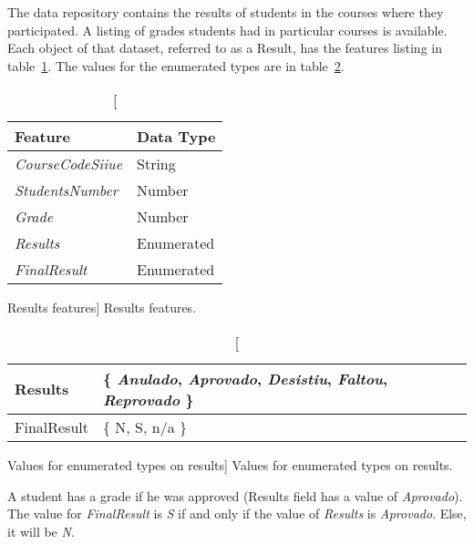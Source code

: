 The data repository contains the results of students in the courses where they
participated. A listing of grades students had in particular courses is
available. Each object of that dataset, referred to as a Result, has the
features listing in table~\ref{tab:results_fetures}. The values for the
enumerated types are in table~\ref{tab:results_fetures_enum}.

\begin{table}[h!]
    \centering

    \begin{tabular}{l l}
        Feature                  & Data Type  \\ \hline
        \textit{CourseCodeSiiue} & String     \\
        \textit{StudentsNumber}  & Number     \\
        \textit{Grade}           & Number     \\
        \textit{Results}         & Enumerated \\
        \textit{FinalResult}     & Enumerated \\
    \end{tabular}

    \caption
        [Results features]
        {Results features.}

    \label{tab:results_fetures}
\end{table}

\begin{table}[h!]
    \centering

    \begin{tabular}{| l | l |}
        \hline
        Results & \{ \textit{Anulado},
                     \textit{Aprovado},
                     \textit{Desistiu},
                     \textit{Faltou},
                     \textit{Reprovado}
                  \} \\ \hline
        FinalResult & \{ N, S, n/a \}  \\ \hline
    \end{tabular}

    \caption
        [Values for enumerated types on results]
        {Values for enumerated types on results.}

    \label{tab:results_fetures_enum}
\end{table}

A student has a grade if he was approved (Results field has a value of
\textit{Aprovado}). The value for \textit{FinalResult} is \textit{S} if and
only if the value of \textit{Results} is \textit{Aprovado}. Else, it will be
\textit{N}.


